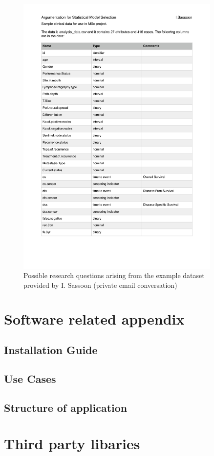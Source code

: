 \begin{figure}[!h]
	\centering
	\includegraphics[page=2,width=0.9\textwidth]{appendix/analysis_data.pdf}
	\caption{Possible research questions arising from the example dataset provided by I. Sassoon (private email conversation)}
	\label{fig:dataset:rq}
\end{figure}


\section{Software related appendix}
\subsection{Installation Guide}
\label{app:installation}

\subsection{Use Cases}
\label{app:use_cases}

\subsection{Structure of application}
\label{app:structure}

\section{Third party libaries}
\label{app:3rdparty}